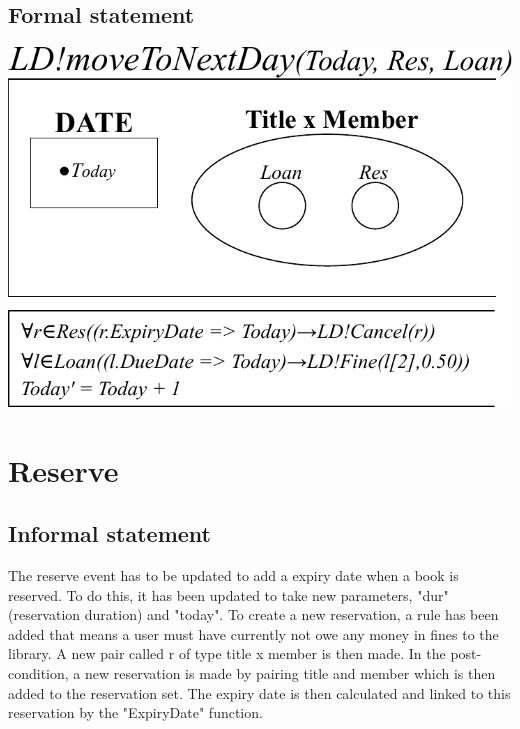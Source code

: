 \documentclass[]{report}
\begin{document}
\subsection{Formal statement}
\begin{center}
	\includegraphics{move_to_next_day.pdf}
\end{center}
\newpage
\section{Reserve}
\subsection{Informal statement}
The reserve event has to be updated to add a expiry date when a book is reserved. To do this, it has been updated to take new parameters, "dur" (reservation duration) and "today". To create a new reservation, a rule has been added that means a user must have currently not owe any money in fines to the library. A new pair called r of type title x member is then made.  In the post-condition, a new reservation is made by pairing title and member which is then added to the reservation set. The expiry date is then calculated and linked to this reservation by the "ExpiryDate" function.
\end{document}
